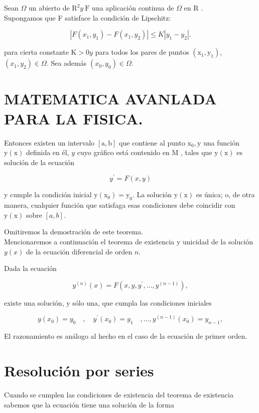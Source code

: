 \documentclass[10pt]{article}
\theoremstyle{plain}
\theoremstyle{definition}
\theoremstyle{remark}
\begin{document}
Sean $\Omega$ un abierto de $\mathrm{R}^{2} y \mathrm{~F}$ una aplicación continua de $\Omega$ en R .\\
Supongamos que F satisface la condición de Lipschitz:

$$
\left|F\left(x_{1}, y_{1}\right)-F\left(x_{1}, y_{2}\right)\right| \leqslant K\left|y_{1}-y_{2}\right| .
$$

para cierta constante $\mathrm{K}>0 y$ para todos los pares de puntos $\left(\mathrm{x}_{1}, \mathrm{y}_{1}\right)$, $\left(x_{1}, y_{2}\right) \in \Omega$. Sea además $\left(x_{0}, y_{0}\right) \in \Omega$.

\section*{MATEMATICA AVANLADA PARA LA FISICA.}
Entonces existen un intervalo $[\mathrm{a}, \mathrm{b}]$ que contiene al punto $\mathrm{x}_0, \mathrm{y}$ una función $\mathrm{y}(\mathrm{x})$ definida en él, $y$ cuyo gráfico está contenido en M , tales que $\mathrm{y}(\mathrm{x})$ es solución de la ecuación

$$
y^{\prime}=F(x, y)
$$

y cumple la condición inicial $\mathrm{y}\left(\mathrm{x}_0\right)=\mathrm{y}_0$. La solución $\mathrm{y}(\mathrm{x})$ es única; o, de otra manera, cualquier función que satisfaga esas condiciones debe coincidir con $\mathrm{y}(\mathrm{x})$ sobre $[a, b]$.

Omitiremos la demostración de este teorema.\\
Mencionaremos a continuación el teorema de existencia y unicidad de la solución $y(x)$ de la ecuación diferencial de orden $n$.

Dada la ecuación

$$
y^{(n)}(x)=F\left(x, y, y^{\prime}, \ldots, y^{(n-1)}\right),
$$

existe una solución, y sólo una, que cumpla las condiciones iniciales

$$
y\left(x_{0}\right)=y_{0} \quad, \quad y^{\prime}\left(x_{0}\right)=y_{1} \quad, \ldots, y^{(n-1)}\left(x_{0}\right)=y_{n-1},
$$

El razonamiento es análogo al hecho en el caso de la ecuación de primer orden.

\section{Resolución por series}
Cuando se cumplen las condiciones de existencia del teorema de existencia sabemos que la ecuación tiene una solución de la forma
\end{document}
